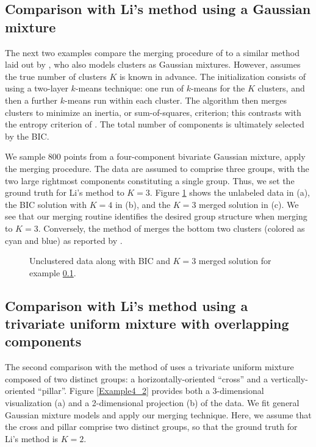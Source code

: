 \documentclass{uwstat572}
\renewcommand\;{\,}
\begin{document}
\subsection{Comparison with Li's method using a Gaussian mixture}\label{four}
The next two examples compare the merging procedure of \cite{Baudry10} to a similar method laid out by \cite{Li05}, who also models clusters as Gaussian mixtures.
However, \cite{Li05} assumes the true number of clusters $K$ is known in advance.
The initialization consists of using a two-layer $k$-means technique: one run of $k$-means for the $K$ clusters, and then a further $k$-means run within each cluster. 
The algorithm then merges clusters to minimize an inertia, or sum-of-squares, criterion; this contrasts with the entropy criterion of \cite{Baudry10}.
The total number of components is ultimately selected by the BIC.

We sample 800 points from a four-component bivariate Gaussian mixture, apply the merging procedure.
The data are assumed to comprise three groups, with the two large rightmost components constituting a single group.
Thus, we set the ground truth for Li's method to $K = 3$.
Figure \ref{Example4_1} shows the unlabeled data in (a), the BIC solution with $K = 4$ in (b), and the $K = 3$ merged solution in (c).
We see that our merging routine identifies the desired group structure when merging to $K = 3$.
Conversely, the method of \cite{Li05} merges the bottom two clusters (colored as cyan and blue) as reported by \cite{Baudry10}.

\begin{figure}
\begin{center}
\end{center}
\caption{Unclustered data along with BIC and $K = 3$ merged solution for example \ref{four}.}
\label{Example4_1}
\end{figure}

\subsection{Comparison with Li's method using a trivariate uniform mixture with overlapping components}\label{five}
The second comparison with the method of \cite{Li05} uses a trivariate uniform mixture composed of two distinct groups: a horizontally-oriented ``cross'' and a vertically-oriented ``pillar''.
Figure \ref{Example4_2} provides both a 3-dimensional visualization (a) and a 2-dimensional projection (b) of the data.
We fit general Gaussian mixture models and apply our merging technique.
Here, we assume that the cross and pillar comprise two distinct groups, so that the ground truth for Li's method is $K = 2$. 
\end{document}
